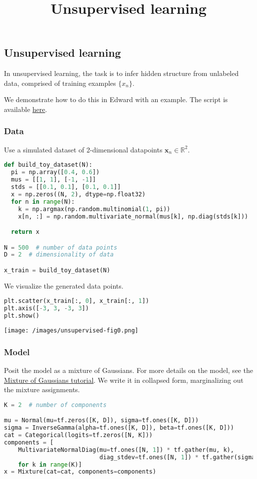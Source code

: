 \title{Unsupervised learning}

\subsection{Unsupervised learning}

In unsupervised learning, the task is to infer hidden structure from
unlabeled data, comprised of training examples $\{x_n\}$.

We demonstrate how to do this in Edward with an example.
The script is available
\href{https://github.com/blei-lab/edward/blob/master/examples/mixture_gaussian_collapsed.py}
{here}.


\subsubsection{Data}

Use a simulated dataset of 2-dimensional datapoints
$\mathbf{x}_n\in\mathbb{R}^2$.
\begin{lstlisting}[language=Python]
def build_toy_dataset(N):
  pi = np.array([0.4, 0.6])
  mus = [[1, 1], [-1, -1]]
  stds = [[0.1, 0.1], [0.1, 0.1]]
  x = np.zeros((N, 2), dtype=np.float32)
  for n in range(N):
    k = np.argmax(np.random.multinomial(1, pi))
    x[n, :] = np.random.multivariate_normal(mus[k], np.diag(stds[k]))

  return x

N = 500  # number of data points
D = 2  # dimensionality of data

x_train = build_toy_dataset(N)
\end{lstlisting}

We visualize the generated data points.
\begin{lstlisting}[language=Python]
plt.scatter(x_train[:, 0], x_train[:, 1])
plt.axis([-3, 3, -3, 3])
plt.show()
\end{lstlisting}
\texttt{[image: /images/unsupervised-fig0.png]}

\subsubsection{Model}

Posit the model as a mixture of Gaussians. For more details on the
model, see the
\href{/tutorials/mixture-gaussian}
{Mixture of Gaussians tutorial}.
We write it in collapsed form, marginalizing out
the mixture assignments.
\begin{lstlisting}[language=Python]
K = 2  # number of components

mu = Normal(mu=tf.zeros([K, D]), sigma=tf.ones([K, D]))
sigma = InverseGamma(alpha=tf.ones([K, D]), beta=tf.ones([K, D]))
cat = Categorical(logits=tf.zeros([N, K]))
components = [
    MultivariateNormalDiag(mu=tf.ones([N, 1]) * tf.gather(mu, k),
                           diag_stdev=tf.ones([N, 1]) * tf.gather(sigma, k))
    for k in range(K)]
x = Mixture(cat=cat, components=components)
\end{lstlisting}



